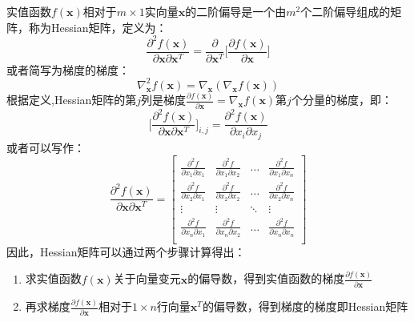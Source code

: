 \documentclass[10pt,a4paper,UTF8]{article}
\begin{document}
实值函数\(f(\mathbf{x})\)相对于\(m\times 1\)实向量\(\mathbf{x}\)的二阶偏导是一个由\(m^{2}\)个二阶偏导组成的矩阵，称为Hessian矩阵，定义为：
\begin{equation}
\label{eq:42}
\frac{\partial^{2} f(\mathbf{x})}{\partial \mathbf{x} \partial \mathbf{x}^{T}} = \frac{\partial}{\partial \mathbf{x}^{T}} \bigg[\frac{\partial f(\mathbf{x})}{\partial \mathbf{x}} \bigg]
\end{equation}
或者简写为梯度的梯度：
\begin{equation}
\label{eq:43}
\nabla_{\mathbf{x}}^{2}f(\mathbf{x}) = \nabla_{\mathbf{x}} (\nabla_{\mathbf{x}} f(\mathbf{x}))
\end{equation}
根据定义,Hessian矩阵的第\(j\)列是梯度\(\frac{\partial f(\mathbf{x})}{\partial \mathbf{x}} = \nabla_{\mathbf{x}} f(\mathbf{x})\)第\(j\)个分量的梯度，即：
\begin{equation}
\label{eq:44}
\bigg[ \frac{\partial^{2}f(\mathbf{x}) }{\partial \mathbf{x} \partial \mathbf{x}^{T}} \bigg]_{i,j} = \frac{\partial^{2}f(\mathbf{x})}{\partial x_{i} \partial x_{j}}
\end{equation}
或者可以写作：
\begin{equation}
\label{eq:45}
\frac{\partial^{2} f(\mathbf{x})}{\partial \mathbf{x} \partial \mathbf{x}^{T}} =
\begin{bmatrix}
\frac{\partial^{2}f}{\partial x_{1}\partial x_{1}} & \frac{\partial^{2}f}{\partial x_{1}\partial x_{2}} & \ldots & \frac{\partial^{2}f}{\partial x_{1}\partial x_{n}} \\
\frac{\partial^{2}f}{\partial x_{2}\partial x_{1}} & \frac{\partial^{2}f}{\partial x_{2}\partial x_{2}} & \ldots & \frac{\partial^{2}f}{\partial x_{2}\partial x_{n}} \\
\vdots & \vdots & \ddots & \vdots \\
\frac{\partial^{2}f}{\partial x_{n}\partial x_{1}} & \frac{\partial^{2}f}{\partial x_{n}\partial x_{2}} & \ldots & \frac{\partial^{2}f}{\partial x_{n}\partial x_{n}} \\
\end{bmatrix}

\end{equation}
因此，Hessian矩阵可以通过两个步骤计算得出：
\begin{enumerate}
\item 求实值函数\(f(\mathbf{x})\)关于向量变元\(\mathbf{x}\)的偏导数，得到实值函数的梯度\(\frac{\partial f(\mathbf{x})}{\partial \mathbf{x}}\)
\item 再求梯度\(\frac{\partial f(\mathbf{x})}{\partial \mathbf{x}}\)相对于\(1\times n\)行向量\(\mathbf{x}^{T}\)的偏导数，得到梯度的梯度即Hessian矩阵
\end{enumerate}
\end{document}
